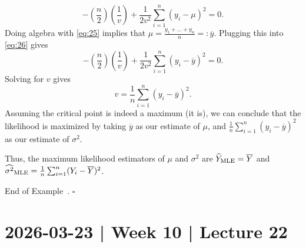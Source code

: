 \documentclass[10pt]{article}
\theoremstyle{definition}
\newtheorem{example}[theorem]{Example}
\renewenvironment{example}
{\begin{oldexample}}
  {\par\smallskip\hfill   End of Example~\theexample. $\square$    \par\end{oldexample}}
\newcommand{\1}[1]{\textbf{1}_{\left[#1\right]}} %
\begin{document}
\begin{example}
\begin{equation}
    -\left(\frac{n}{2}\right)\left( \frac{1}{v} \right) + \frac{1}{2v^{2}} \sum_{i=1}^{n} (y_{i}-\mu)^{2} =0.
  \end{equation}
  Doing algebra with \cref{eq:25} implies that
  $\mu=\frac{y_{1}+\ldots+y_{n}}{n}=:\overline{y}$. Plugging this into
  \cref{eq:26} gives
  \begin{equation*}
    -\left(\frac{n}{2}\right)\left( \frac{1}{v} \right) + \frac{1}{2v^{2}} \sum_{i=1}^{n} (y_{i}-\overline{y})^{2} =0.
  \end{equation*}
  Solving for $v$ gives
  \begin{equation*}
    v = \frac{1}{n}\sum_{i=1}^{n} (y_{i}-\overline{y})^{2}.
  \end{equation*}
  Assuming the critical point is indeed a maximum (it is), we can conclude
  that the likelihood is maximized by taking $\overline{y}$ as our estimate of
  $\mu$, and $\frac{1}{n}\sum_{i=1}^{n} (y_{i}-\overline{y})^{2}$ as our
  estimate of $\sigma^{2}$.
  
  Thus, the maximum likelihood estimators of $\mu$ and $\sigma^{2}$ are
  $\widehat{Y}_{\rm MLE} = \overline{Y}$ and
  $\widehat{\sigma^{2}}_{\rm MLE} = \frac{1}{n}\sum_{i=1}^{n}
  (Y_{i}-\overline{Y})^{2}$.
\end{example}


\section{2026-03-23 | Week 10 | Lecture 22}


\end{document}
